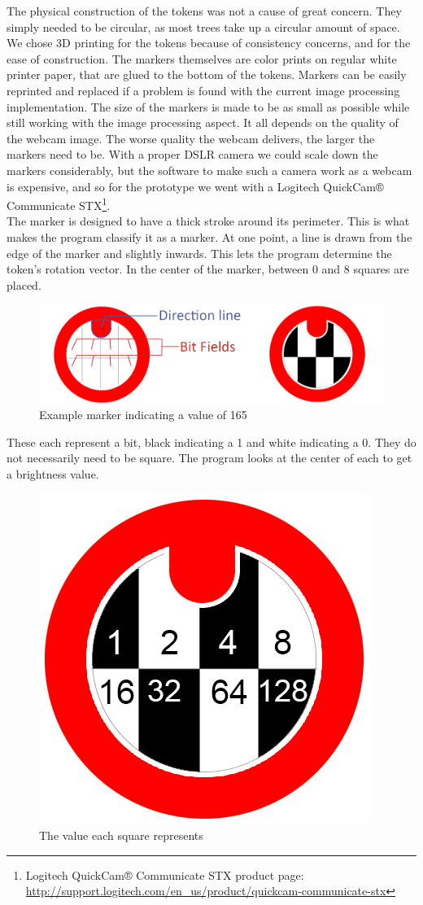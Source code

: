The physical construction of the tokens was not a cause of great concern. They simply needed to be circular, as most trees take up a circular amount of space. We chose 3D printing for the tokens because of consistency concerns, and for the ease of construction. The markers themselves are color prints on regular white printer paper, that are glued to the bottom of the tokens. Markers can be easily reprinted and replaced if a problem is found with the current image processing implementation. 
The size of the markers is made to be as small as possible while still working with the image processing aspect. It all depends on the quality of the webcam image. The worse quality the webcam delivers, the larger the markers need to be. With a proper DSLR camera we could scale down the markers considerably, but the software to make such a camera work as a webcam is expensive, and so for the prototype we went with a Logitech QuickCam® Communicate STX\footnote{Logitech QuickCam® Communicate STX product page: \url{http://support.logitech.com/en_us/product/quickcam-communicate-stx}}.\\

The marker is designed to have a thick stroke around its perimeter. This is what makes the program classify it as a marker. At one point, a line is drawn from the edge of the marker and slightly inwards. This lets the program determine the token's rotation vector. In the center of the marker, between 0 and 8 squares are placed.
\begin{figure}[H]
	\centering
	\includegraphics[width=1\linewidth]{figure/Design/markermap.png}
	\caption{Example marker indicating a value of 165}
	\label{fig:circle2}
\end{figure}

These each represent a bit, black indicating a 1 and white indicating a 0. They do not necessarily need to be square. The program looks at the center of each to get a brightness value.

\begin{figure}[H]
	\centering
	\includegraphics[width=0.3\linewidth]{figure/Design/markerValues.png}
	\caption{The value
		 each square represents}
	\label{fig:circle}
\end{figure}

